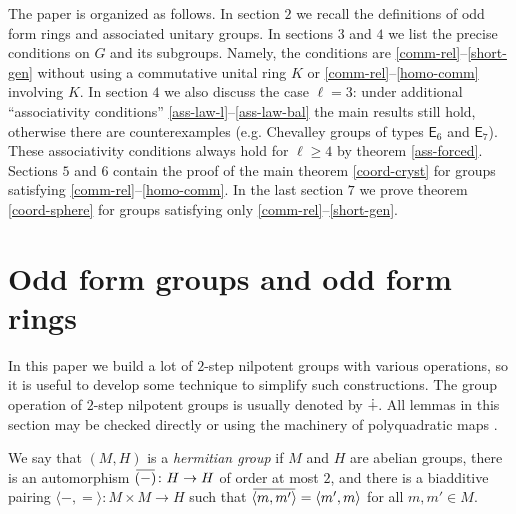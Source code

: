 \documentclass{article}
\theoremstyle{definition}
\newcommand{\inv}[1]{
    \!\;\overline{
        \!\!\:#1\vphantom !\!\!\:
    }\;\!
}
\begin{document}
The paper is organized as follows. In section \(2\) we recall the definitions of odd form rings and associated unitary groups. In sections \(3\) and \(4\) we list the precise conditions on \(G\) and its subgroups. Namely, the conditions are \ref{comm-rel}--\ref{short-gen} without using a commutative unital ring \(K\) or \ref{comm-rel}--\ref{homo-comm} involving \(K\). In section \(4\) we also discuss the case \(\ell = 3\): under additional ``associativity conditions'' \ref{ass-law-l}--\ref{ass-law-bal} the main results still hold, otherwise there are counterexamples (e.g. Chevalley groups of types \(\mathsf E_6\) and \(\mathsf E_7\)). These associativity conditions always hold for \(\ell \geq 4\) by theorem \ref{ass-forced}. Sections \(5\) and \(6\) contain the proof of the main theorem \ref{coord-cryst} for groups satisfying \ref{comm-rel}--\ref{homo-comm}. In the last section \(7\) we prove theorem \ref{coord-sphere} for groups satisfying only \ref{comm-rel}--\ref{short-gen}.



\section{Odd form groups and odd form rings}

In this paper we build a lot of \(2\)-step nilpotent groups with various operations, so it is useful to develop some technique to simplify such constructions. The group operation of \(2\)-step nilpotent groups is usually denoted by \(\dotplus\). All lemmas in this section may be checked directly or using the machinery of polyquadratic maps \cite[\S 1.3]{thesis}.

We say that \((M, H)\) is a \textit{hermitian group} if \(M\) and \(H\) are abelian groups, there is an automorphism \(
    \inv{(-)} \colon H \to H
\) of order at most \(2\), and there is a biadditive pairing \(
    \langle {-}, {=} \rangle
    \colon M \times M
    \to H
\) such that \(
    \inv{\langle m, m' \rangle}
    =
    \langle m', m \rangle
\) for all \(m, m' \in M\).
\end{document}
